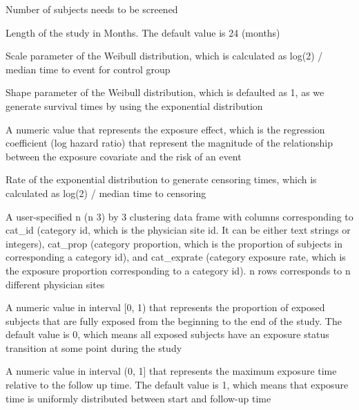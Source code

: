 \documentclass[a4paper]{book}
\begin{document}
\begin{Arguments}
\begin{ldescription}
\item[\code{N}] 
Number of subjects needs to be screened

\item[\code{duration}] 
Length of the study in Months. The default value is 24 (months)

\item[\code{lambda}] 
Scale parameter of the Weibull distribution, which is calculated as log(2) / median time to event for control group

\item[\code{rho}] 
Shape parameter of the Weibull distribution, which is defaulted as 1, as we generate survival times by using the exponential distribution

\item[\code{beta}] 
A numeric value that represents the exposure effect, which is the
regression coefficient (log hazard ratio) that represent the magnitude of
the relationship between the exposure covariate and the risk of an event

\item[\code{rateC}] 
Rate of the exponential distribution to generate censoring times, which is calculated as log(2) / median time to censoring

\item[\code{df}] 
A user-specified n (n 3) by 3 clustering data frame with columns corresponding to cat\_id (category id, which is the physician site id. It can be either text strings or integers), cat\_prop (category proportion, which is the proportion of subjects in corresponding a category id), and cat\_exprate (category exposure rate, which is the exposure proportion corresponding to a category id). n rows corresponds to n different physician sites

\item[\code{prop.fullexp}] 
A numeric value in interval [0, 1) that represents the proportion of exposed subjects that are fully exposed from the beginning to the end of the study. The default value is 0, which means all exposed subjects have an exposure status transition at some point during the study

\item[\code{maxrelexptime}] 
A numeric value in interval (0, 1] that represents the maximum exposure time relative to the follow up time. The default value is 1, which means that exposure time is uniformly distributed between start and follow-up time


\end{ldescription}
\end{Arguments}
\end{document}
